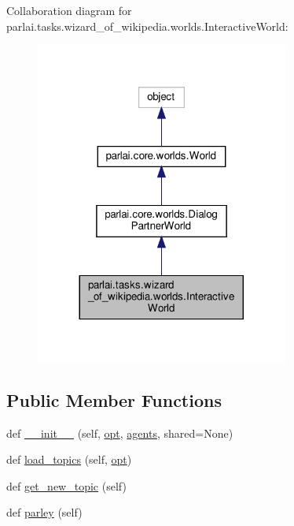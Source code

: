 Collaboration diagram for parlai.\+tasks.\+wizard\+\_\+of\+\_\+wikipedia.\+worlds.\+Interactive\+World\+:
\nopagebreak
\begin{figure}[H]
\begin{center}
\leavevmode
\includegraphics[width=236pt]{d6/d5d/classparlai_1_1tasks_1_1wizard__of__wikipedia_1_1worlds_1_1InteractiveWorld__coll__graph}
\end{center}
\end{figure}
\subsection*{Public Member Functions}
\begin{DoxyCompactItemize}
\item 
def \hyperlink{classparlai_1_1tasks_1_1wizard__of__wikipedia_1_1worlds_1_1InteractiveWorld_a17330f1fd256bd53eafea1c7e119d77d}{\+\_\+\+\_\+init\+\_\+\+\_\+} (self, \hyperlink{classparlai_1_1core_1_1worlds_1_1World_a3640d92718acd3e6942a28c1ab3678bd}{opt}, \hyperlink{classparlai_1_1core_1_1worlds_1_1DialogPartnerWorld_a04185d1d55ca86c96c796f12f2226fc9}{agents}, shared=None)
\item 
def \hyperlink{classparlai_1_1tasks_1_1wizard__of__wikipedia_1_1worlds_1_1InteractiveWorld_af4efe25e565dbf73a46d1559eb425243}{load\+\_\+topics} (self, \hyperlink{classparlai_1_1core_1_1worlds_1_1World_a3640d92718acd3e6942a28c1ab3678bd}{opt})
\item 
def \hyperlink{classparlai_1_1tasks_1_1wizard__of__wikipedia_1_1worlds_1_1InteractiveWorld_a01cde3e1317b31cf52024283f061fdf6}{get\+\_\+new\+\_\+topic} (self)
\item 
def \hyperlink{classparlai_1_1tasks_1_1wizard__of__wikipedia_1_1worlds_1_1InteractiveWorld_afcda29202fc3fd773522edbd3c40e4a4}{parley} (self)
\end{DoxyCompactItemize}
